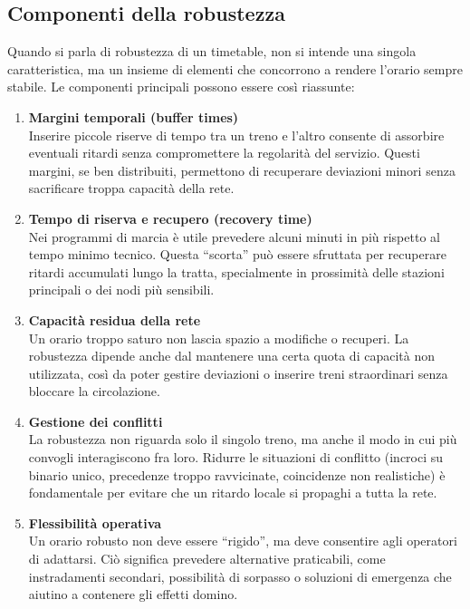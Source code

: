 \documentclass[a4paper,12pt]{report}
\begin{document}
\subsection{Componenti della robustezza}
Quando si parla di robustezza di un timetable, non si intende una singola caratteristica, ma un insieme di elementi che concorrono a rendere l’orario sempre stabile. Le componenti principali possono essere così riassunte:
\begin{enumerate}
    \item \textbf{Margini temporali (buffer times)} \\
    Inserire piccole riserve di tempo tra un treno e l’altro consente di assorbire eventuali ritardi senza compromettere la regolarità del servizio. Questi margini, se ben distribuiti, permettono di recuperare deviazioni minori senza sacrificare troppa capacità della rete.

    \item \textbf{Tempo di riserva e recupero (recovery time)} \\
    Nei programmi di marcia è utile prevedere alcuni minuti in più rispetto al tempo minimo tecnico. Questa “scorta” può essere sfruttata per recuperare ritardi accumulati lungo la tratta, specialmente in prossimità delle stazioni principali o dei nodi più sensibili.

    \item \textbf{Capacità residua della rete} \\
    Un orario troppo saturo non lascia spazio a modifiche o recuperi. La robustezza dipende anche dal mantenere una certa quota di capacità non utilizzata, così da poter gestire deviazioni o inserire treni straordinari senza bloccare la circolazione.

    \item \textbf{Gestione dei conflitti} \\
    La robustezza non riguarda solo il singolo treno, ma anche il modo in cui più convogli interagiscono fra loro. Ridurre le situazioni di conflitto (incroci su binario unico, precedenze troppo ravvicinate, coincidenze non realistiche) è fondamentale per evitare che un ritardo locale si propaghi a tutta la rete.

    \item \textbf{Flessibilità operativa} \\
    Un orario robusto non deve essere “rigido”, ma deve consentire agli operatori di adattarsi. Ciò significa prevedere alternative praticabili, come instradamenti secondari, possibilità di sorpasso o soluzioni di emergenza che aiutino a contenere gli effetti domino.

    \end{enumerate}
    
\end{document}
